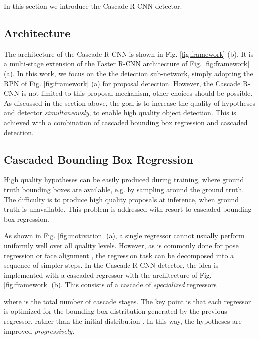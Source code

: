 \documentclass[10pt,journal,compsoc]{IEEEtran}
\begin{document}
In this section we introduce the Cascade R-CNN detector.

\subsection{Architecture}

The architecture of the Cascade R-CNN is shown in Fig. \ref{fig:framework}
(b). It is a multi-stage extension of the Faster R-CNN architecture of
Fig. \ref{fig:framework} (a). In this work, we focus on the
the detection sub-network, simply adopting the
RPN \cite{DBLP:conf/nips/RenHGS15} of Fig. \ref{fig:framework} (a) for
proposal detection. However, the Cascade R-CNN is not limited to this
proposal mechanism, other choices should be possible. As discussed in the
section above, the goal is to increase the quality of hypotheses and
detector \textit{simultaneously}, to enable high quality object detection.
This is achieved with a combination of cascaded bounding box regression
and cascaded detection.

\subsection{Cascaded Bounding Box Regression}
\label{subsec:cascade bbox}

High quality hypotheses can be easily produced during training, where
ground truth bounding boxes are available, e.g. by sampling around the
ground truth. The difficulty is to produce high quality proposals at
inference, when ground truth is unavailable. This problem is addressed
with resort to cascaded bounding box regression.

As shown in Fig. \ref{fig:motivation} (a), a single regressor
cannot usually perform uniformly well over all quality levels.
However, as is commonly done for pose regression
\cite{DBLP:conf/cvpr/DollarWP10} or face
alignment \cite{DBLP:conf/cvpr/CaoWWS12,DBLP:conf/cvpr/XiongT13,yan2013learn},
the regression task can be decomposed into a sequence of simpler
steps. In the Cascade R-CNN detector, the idea is implemented
with a cascaded regressor with the architecture of
Fig. \ref{fig:framework} (b). This consists of a cascade
of {\it specialized\/} regressors

where  is the total number of cascade stages. The key point
is that each regressor  is optimized for the bounding box
distribution  generated by the previous regressor, rather
than the initial distribution . In this way, the hypotheses
are improved {\it progressively.\/}
\end{document}
